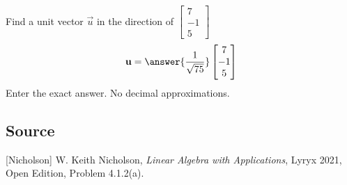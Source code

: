 \documentclass{ximera}
\author{}
\begin{document}
\begin{exercise}
Find a unit vector $\vec{u}$ in the direction of $\begin{bmatrix}7\\-1\\5\end{bmatrix}$
$$\vec{u}=\answer{\frac{1}{\sqrt{75}}}\begin{bmatrix}7\\-1\\5\end{bmatrix}$$
Enter the exact answer.  No decimal approximations.
 
\end{exercise}

\subsection*{Source}
[Nicholson] W. Keith Nicholson, {\it Linear Algebra with Applications}, Lyryx 2021, Open Edition, Problem 4.1.2(a).
\end{document}
